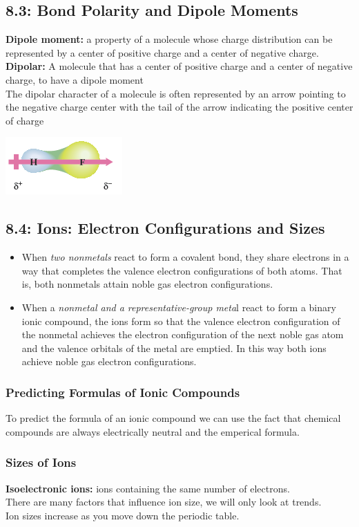 \documentclass[12pt]{extarticle}
\begin{document}
\subsection*{8.3: Bond Polarity and Dipole Moments}
\textbf{Dipole moment:}
a property of a molecule whose charge distribution can be represented by a center of positive charge and a center of negative charge.
\\\textbf{Dipolar: }
A molecule that has a center of positive charge and a center of negative charge, to have a dipole moment
\\ The dipolar character of a molecule is often represented by an arrow pointing to the negative charge center with the tail of the arrow indicating the positive center of charge
\begin{center}
\includegraphics[scale=0.75]{DipolarEX.png}
\end{center}

\subsection*{8.4: Ions: Electron Configurations and Sizes}
\begin{itemize}
    \item {When \textit{two nonmetals} react to form a covalent bond, they share electrons in a way that completes the valence electron configurations of both atoms. That is, both nonmetals attain noble gas electron configurations.}
    \item{ When a \textit{nonmetal and a representative-group meta}l react to form a binary ionic compound, the ions form so that the valence electron configuration of the nonmetal achieves the electron configuration of the next noble gas atom and the valence orbitals of the metal are emptied. In this way both ions achieve noble gas electron configurations.}
\end{itemize}
\subsubsection*{Predicting Formulas of Ionic Compounds}
To predict the formula of an ionic compound we can use the fact that chemical compounds are always electrically neutral and the emperical formula.
\subsubsection*{Sizes of Ions}
\textbf{Isoelectronic ions:}
ions containing the same number of electrons.
\\There are many factors that influence ion size, we will only look at trends.
\\Ion sizes increase as you move down the periodic table.
\end{document}
